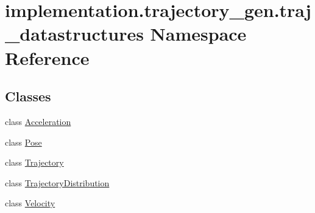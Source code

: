 \hypertarget{namespaceimplementation_1_1trajectory__gen_1_1traj__datastructures}{}\section{implementation.\+trajectory\+\_\+gen.\+traj\+\_\+datastructures Namespace Reference}
\label{namespaceimplementation_1_1trajectory__gen_1_1traj__datastructures}
\subsection*{Classes}
\begin{DoxyCompactItemize}
\item 
class \hyperlink{classimplementation_1_1trajectory__gen_1_1traj__datastructures_1_1_acceleration}{Acceleration}
\item 
class \hyperlink{classimplementation_1_1trajectory__gen_1_1traj__datastructures_1_1_pose}{Pose}
\item 
class \hyperlink{classimplementation_1_1trajectory__gen_1_1traj__datastructures_1_1_trajectory}{Trajectory}
\item 
class \hyperlink{classimplementation_1_1trajectory__gen_1_1traj__datastructures_1_1_trajectory_distribution}{Trajectory\+Distribution}
\item 
class \hyperlink{classimplementation_1_1trajectory__gen_1_1traj__datastructures_1_1_velocity}{Velocity}
\end{DoxyCompactItemize}
